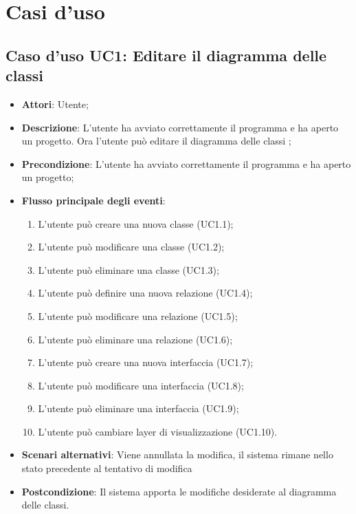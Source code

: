 \documentclass[a4paper]{report}
\begin{document}
\chapter{Casi d'uso }
\section{Caso d'uso UC1: Editare il diagramma delle classi}
\begin{itemize}
	\item \textbf{Attori}: Utente;
	
	\item \textbf{Descrizione}: L'utente ha avviato correttamente il programma e ha aperto un progetto. Ora l'utente può editare il diagramma delle classi ;
	
	\item \textbf{Precondizione}: L'utente ha avviato correttamente il programma e ha aperto un progetto;
	\item \textbf{Flusso principale degli eventi}:
	\begin{enumerate}
		\item L'utente può creare una nuova classe (UC1.1);
		\item L'utente può modificare una classe (UC1.2);
		\item L'utente può eliminare una classe (UC1.3);
		\item L'utente può definire una nuova relazione (UC1.4);
		\item L'utente può modificare una relazione (UC1.5);
		\item L'utente può eliminare una relazione (UC1.6);
		\item L'utente può creare una nuova interfaccia (UC1.7);
		\item L'utente può modificare una interfaccia (UC1.8);
		\item L'utente può eliminare una interfaccia (UC1.9);
		\item L'utente può cambiare layer di visualizzazione (UC1.10).
	\end{enumerate}
	
	\item \textbf{Scenari alternativi}: Viene annullata la modifica, il sistema
	rimane nello stato precedente al tentativo di modifica
	
	\item \textbf{Postcondizione}: Il sistema apporta le modifiche desiderate al diagramma delle classi.
\end{itemize}
\end{document}
